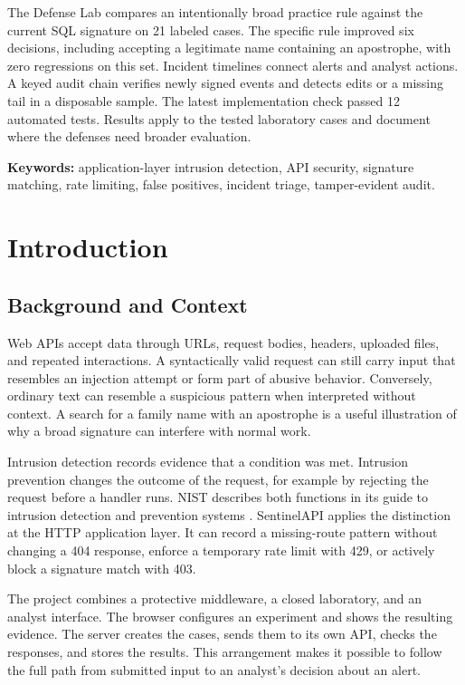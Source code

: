 \documentclass[11pt,a4paper,oneside]{report}
\begin{document}
The Defense Lab compares an intentionally broad practice rule against the current SQL signature on 21 labeled cases. The specific rule improved six decisions, including accepting a legitimate name containing an apostrophe, with zero regressions on this set. Incident timelines connect alerts and analyst actions. A keyed audit chain verifies newly signed events and detects edits or a missing tail in a disposable sample. The latest implementation check passed 12 automated tests. Results apply to the tested laboratory cases and document where the defenses need broader evaluation.

\textbf{Keywords:} application-layer intrusion detection, API security, signature matching, rate limiting, false positives, incident triage, tamper-evident audit.

\tableofcontents
\clearpage
\pagestyle{sentinel}

\chapter{Introduction}
\section{Background and Context}
Web APIs accept data through URLs, request bodies, headers, uploaded files, and repeated interactions. A syntactically valid request can still carry input that resembles an injection attempt or form part of abusive behavior. Conversely, ordinary text can resemble a suspicious pattern when interpreted without context. A search for a family name with an apostrophe is a useful illustration of why a broad signature can interfere with normal work.

Intrusion detection records evidence that a condition was met. Intrusion prevention changes the outcome of the request, for example by rejecting the request before a handler runs. NIST describes both functions in its guide to intrusion detection and prevention systems \cite{nist}. SentinelAPI applies the distinction at the HTTP application layer. It can record a missing-route pattern without changing a 404 response, enforce a temporary rate limit with 429, or actively block a signature match with 403.

The project combines a protective middleware, a closed laboratory, and an analyst interface. The browser configures an experiment and shows the resulting evidence. The server creates the cases, sends them to its own API, checks the responses, and stores the results. This arrangement makes it possible to follow the full path from submitted input to an analyst's decision about an alert.
\end{document}
